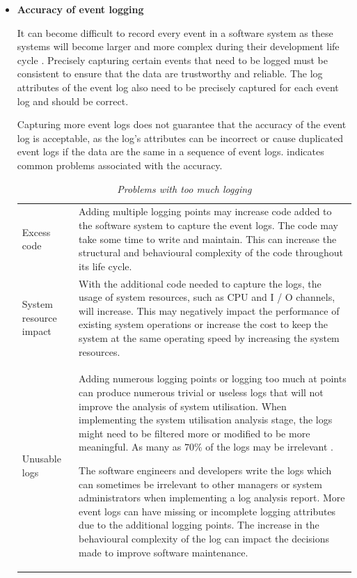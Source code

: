 \begin{itemize}
	\item \textbf{Accuracy of event logging}\par It can become difficult to record every event in a software system as these systems will become larger and more complex during their development life cycle \cite{Stojanov2017}. Precisely capturing certain events that need to be logged must be consistent to ensure that the data are trustworthy and reliable. The log attributes of the event log also need to be precisely captured for each event log and should be correct.\par Capturing more event logs does not guarantee that the accuracy of the event log is acceptable, as the log's attributes can be incorrect or cause duplicated event logs if the data are the same in a sequence of event logs.  indicates common problems associated with the accuracy.

	\begin{table}[!htb]
		\centering
		\caption[Problems with too much logging]
		{\textit{Problems with too much logging \cite{Zhu2015}}}
		\label{tbl:ch1_loggingTooMuch}
		\begin{tabularx}{\linewidth}{p{3cm}X}
			\toprule 
			\thead{Problem}  & \thead{Description} \\
			\midrule

			\rowcolor{lightgray}
			Excess code & Adding multiple logging points may increase code added to the software system to capture the event logs. The code may take some time to write and maintain. This can increase the structural and behavioural complexity of the code throughout its life cycle. \\

			System resource impact & With the additional code needed to capture the logs, the usage of system resources, such as CPU and I / O channels, will increase. This may negatively impact the performance of existing system operations or increase the cost to keep the system at the same operating speed by increasing the system resources.\\

			\rowcolor{lightgray}
			Unusable logs & Adding numerous logging points or logging too much at points can produce numerous trivial or useless logs that will not improve the analysis of system utilisation. When implementing the system utilisation analysis stage, the logs might need to be filtered more or modified to be more meaningful. As many as $70\%$ of the logs may be irrelevant \cite{Fedaghi2010}. \par The software engineers and developers write the logs which can sometimes be irrelevant to other managers or system administrators when implementing a log analysis report. More event logs can have missing or incomplete logging attributes due to the additional logging points. The increase in the behavioural complexity of the log can impact the decisions made to improve software maintenance. \\
			\bottomrule
		\end{tabularx}
	\end{table}


\end{itemize}
